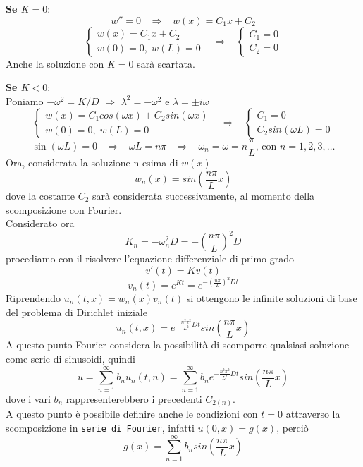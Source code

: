 {\bf Se $K=0$}:
\[
	w''=0
	\;\;\;
	\Rightarrow
	\;\;\;
	w(x)=C_1x + C_2
\]
\[
	\left\{
	\begin{array}{l}
		w(x)=C_1x + C_2\\
		w(0)=0, \; w(L)=0
	\end{array}
	\right.
	\;\;\;
	\Rightarrow
	\;\;\;
	\left\{
	\begin{array}{l}
		C_1=0\\
		C_2=0
	\end{array}
	\right.
\]
Anche la soluzione con $K=0$ sar\`a scartata.

{\bf Se $K<0$}:\\
Poniamo $-\omega^2 = K/D$ $\Rightarrow$ $\lambda^2 = - \omega^2$ e $\lambda=\pm i\omega$
\[
	\left\{
	\begin{array}{l}
		w(x)=C_1 cos(\omega x) + C_2 sin(\omega x)\\
		w(0)=0, \; w(L)=0
	\end{array}
	\right.
	\;\;\;
	\Rightarrow
	\;\;\;
	\left\{
	\begin{array}{l}
		C_1=0\\
		C_2 sin(\omega L)= 0
	\end{array}
	\right.
\]
\[
	\sin (\omega L)=0
	\;\;\;
	\Rightarrow
	\;\;\;
	\omega L = n\pi
	\;\;\;
	\Rightarrow
	\;\;\;
	\omega_n= \omega= n \frac{\pi}{L} \text{, con }n=1,2,3,\ldots
\]
Ora, considerata la soluzione n-esima di $w(x)$
\[
	w_n(x)=sin\left(\frac{n\pi}{L}x \right)
\]
dove la costante $C_2$ sar\`a considerata successivamente, al momento della scomposizione con Fourier.\\
Considerato ora
\[
	K_n=-\omega_n^2 D= -\left(\frac{n\pi}{L}\right)^2D
\]
procediamo con il risolvere l'equazione differenziale di primo grado
\[
	v'(t)= Kv(t)
\]
\[
	v_n(t)= e^{Kt}=e^{-\left(\frac{n\pi}{L}\right)^2Dt}
\]
Riprendendo  $u_n(t,x)= w_n(x) v_n(t)$ si ottengono le infinite soluzioni
di base del problema di Dirichlet iniziale
\[
	u_n(t,x)= e^{-\frac{n^2\pi^2}{L^2} Dt}
	sin\left(\frac{n\pi}{L}x \right)
\]
A questo punto Fourier considera la possibilit\`a di scomporre qualsiasi
soluzione come serie di sinusoidi, quindi
\[
	u= \sum_{n=1}^{\infty} b_n u_n(t,n)=
	\sum_{n=1}^{\infty}b_n e^{-\frac{n^2\pi^2}{L^2} Dt}
	sin\left(\frac{n\pi}{L}x \right)
\]
dove i vari $b_n$ rappresenterebbero i precedenti $C_{2(n)}$.\\
A questo punto \`e possibile definire anche le condizioni con $t=0$ attraverso
la scomposizione in \texttt{serie di Fourier}, infatti $u(0,x)=g(x)$, perci\`o
\[
	g(x)= \sum_{n=1}^{\infty} b_n sin\left(\frac{n\pi}{L}x \right)
\]
